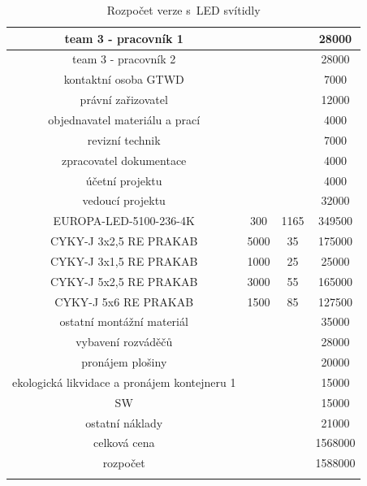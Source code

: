 \documentclass[a4paper, twoside, 11pt]{article}
\begin{document}
\begin{table}[H]
\begin{tabular}{ !{\vrule width 2pt} c | c | c | c  !{\vrule width 2pt}}
				team 3 - pracovník 1 && 28000\\ \hline
				team 3 - pracovník 2 && 28000\\ \hline
				kontaktní osoba GTWD && 7000\\ \hline
				právní zařizovatel && 12000\\ \hline
				objednavatel materiálu a prací && 4000\\ \hline
				revizní technik && 7000\\ \hline
				zpracovatel dokumentace && 4000\\ \hline
				účetní projektu && 4000\\ \hline
				vedoucí projektu && 32000\\ \hline
				EUROPA-LED-5100-236-4K & 300 & 1165 & 349500\\ \hline
				CYKY-J 3x2,5 RE PRAKAB & 5000 & 35 & 175000\\ \hline
				CYKY-J 3x1,5 RE PRAKAB & 1000 & 25 & 25000\\ \hline
				CYKY-J 5x2,5 RE PRAKAB & 3000 & 55 & 165000\\ \hline
				CYKY-J 5x6 RE PRAKAB & 1500 & 85 & 127500\\ \hline
				ostatní montážní materiál && 35000\\ \hline
				vybavení rozváděčů && 28000\\ \hline
				pronájem plošiny && 20000\\ \hline
				ekologická likvidace a pronájem kontejneru 1 && 15000\\ \hline
				SW && 15000\\ \hline
				ostatní náklady && 21000\\ 
				celková cena && 1568000\\ \hline
				rozpočet && 1588000\\ 
				
				\end{tabular}
			\caption{Rozpočet verze s~LED svítidly}
			\end{table}
			
\end{document}
